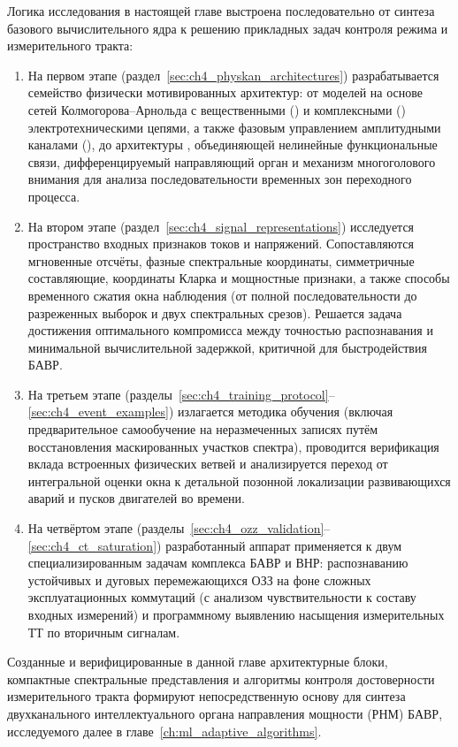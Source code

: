 Логика исследования в настоящей главе выстроена последовательно от
синтеза базового вычислительного ядра к решению прикладных задач
контроля режима и измерительного тракта:
\begin{enumerate}
    \item На первом этапе (раздел~\ref{sec:ch4_physkan_architectures})
    разрабатывается семейство физически мотивированных архитектур:
    от моделей на основе сетей Колмогорова--Арнольда с вещественными
    () и комплексными () электротехническими
    цепями, а также фазовым управлением амплитудными каналами
    (), до архитектуры ,
    объединяющей нелинейные функциональные связи, дифференцируемый
    направляющий орган и механизм многоголового внимания для анализа
    последовательности временных зон переходного процесса.
    \item На втором этапе (раздел~\ref{sec:ch4_signal_representations})
    исследуется пространство входных признаков токов и напряжений.
    Сопоставляются мгновенные отсчёты, фазные спектральные координаты,
    симметричные составляющие, координаты Кларка и мощностные признаки,
    а также способы временного сжатия окна наблюдения (от полной
    последовательности до разреженных выборок и двух спектральных срезов).
    Решается задача достижения оптимального компромисса между точностью
    распознавания и минимальной вычислительной задержкой, критичной
    для быстродействия БАВР.
    \item На третьем этапе (разделы~\ref{sec:ch4_training_protocol}--\ref{sec:ch4_event_examples})
    излагается методика обучения (включая предварительное самообучение
    на неразмеченных записях путём восстановления маскированных участков
    спектра), проводится верификация вклада встроенных физических ветвей
    и анализируется переход от интегральной оценки окна к детальной
    позонной локализации развивающихся аварий и пусков двигателей во времени.
    \item На четвёртом этапе (разделы~\ref{sec:ch4_ozz_validation}--\ref{sec:ch4_ct_saturation})
    разработанный аппарат применяется к двум специализированным задачам
    комплекса БАВР и ВНР: распознаванию устойчивых и дуговых перемежающихся
    ОЗЗ на фоне сложных эксплуатационных коммутаций (с анализом
    чувствительности к составу входных измерений) и программному выявлению
    насыщения измерительных ТТ по вторичным сигналам.
\end{enumerate}

Созданные и верифицированные в данной главе архитектурные блоки,
компактные спектральные представления и алгоритмы контроля достоверности
измерительного тракта формируют непосредственную основу для синтеза
двухканального интеллектуального органа направления мощности (РНМ) БАВР,
исследуемого далее в главе~\ref{ch:ml_adaptive_algorithms}.

